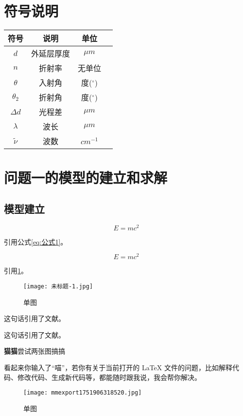 \documentclass{cumcmthesis}
\begin{document}
\section{符号说明}
\begin{table}[H]
\centering
\begin{tabularx}{\textwidth}{CCCC}%
\toprule
符号    & 说明    & 单位    \\
\midrule
$d$     & 外延层厚度 & $\mu m$ \\
$n$     & 折射率 & 无单位 \\
$\theta$ & 入射角 & 度($^\circ$) \\
$\theta_2$ & 折射角 & 度($^\circ$) \\
$\Delta d$ & 光程差 & $\mu m$ \\
$\lambda$ & 波长 & $\mu m$ \\
$\tilde{\nu}$ & 波数 & $cm^{-1}$ \\
\bottomrule
\end{tabularx}
\label{tab:符号说明}
\end{table}

\section{问题一的模型的建立和求解}
\subsection{模型建立}

$$
E = mc^2
$$

引用公式\cref{eq:公式1}。

\begin{equation}
\label{eq:公式1}
E = mc^2
\end{equation}

引用\cref{fig:山田凉}。

\begin{figure}[H]
\centering
\texttt{[image: 未标题-1.jpg]}
\caption{单图}
\label{fig:山田凉}
\end{figure}

这句话引用了文献\cite{司守奎2011数学建模算法与应用}。

这句话引用了文献。

\textbf{猫猫}尝试两张图搞搞

看起来你输入了“喵”，若你有关于当前打开的 LaTeX 文件的问题，比如解释代码、修改代码、生成新代码等，都能随时跟我说，我会帮你解决。
\begin{figure}[H]
\centering
\texttt{[image: mmexport1751906318520.jpg]}
\caption{单图}
\label{fig:新图}
\end{figure}
\end{document}
